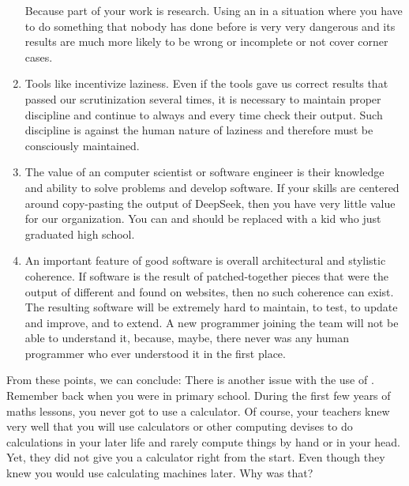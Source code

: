 \begin{noglslink}
\begin{enumerate}
Because part of your work is research. %
Using an  in a situation where you have to do something that nobody has done before is very very dangerous and its results are much more likely to be wrong or incomplete or not cover corner cases.%
%
\item Tools like  incentivize laziness. %
Even if the tools gave us correct results that passed our scrutinization several times, it is necessary to maintain proper discipline and continue to always and every time check their output. %
Such discipline is against the human nature of laziness and therefore must be consciously maintained.%
%
\item The value of an computer scientist or software engineer is their knowledge and ability to solve problems and develop software. %
If your skills are centered around copy-pasting the output of DeepSeek, then you have very little value for our organization. %
You can and should be replaced with a kid who just graduated high school.%
%
\item An important feature of good software is overall architectural and stylistic coherence. %
If software is the result of patched-together pieces that were the output of different  and found on websites, then no such coherence can exist. %
The resulting software will be extremely hard to maintain, to test, to update and improve, and to extend. %
A new programmer joining the team will not be able to understand it, because, maybe, there never was any human programmer who ever understood it in the first place.%
%
\end{enumerate}%
%
From these points, we can conclude:%
%
%
%
There is another issue with the use of .
Remember back when you were in primary school.
During the first few years of maths lessons, you never got to use a calculator.
Of course, your teachers knew very well that you will use calculators or other computing devises to do calculations in your later life and rarely compute things by hand or in your head.
Yet, they did not give you a calculator right from the start.
Even though they knew you would use calculating machines later.
Why was that?


\end{noglslink}

